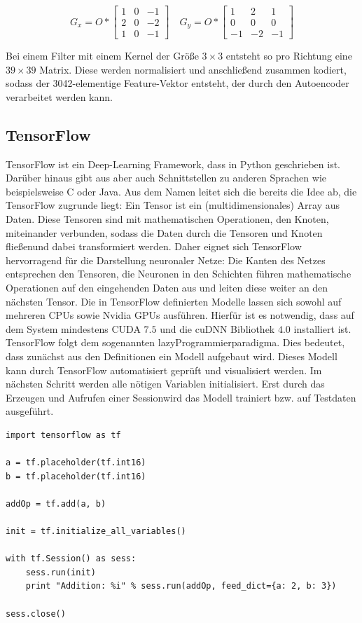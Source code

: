 $$ G_{x} = O * \begin{bmatrix}
  1 & 0 & -1 \\
  2 & 0 & -2 \\
  1 & 0 & -1
\end{bmatrix} \quad
G_{y} = O * \begin{bmatrix}
   1 &  2 &  1 \\
   0 &  0 &  0 \\
  -1 & -2 & -1
\end{bmatrix}
$$

Bei einem Filter mit einem Kernel der Größe $3 \times 3$ entsteht so pro Richtung eine $39 \times 39$ Matrix. Diese werden normalisiert und anschließend zusammen kodiert, sodass der 3042-elementige Feature-Vektor entsteht, der durch den Autoencoder verarbeitet werden kann.

\subsection{TensorFlow}

TensorFlow ist ein Deep-Learning Framework, dass in Python geschrieben ist. Darüber hinaus gibt aus aber auch Schnittstellen zu anderen Sprachen wie beispielsweise C oder Java. Aus dem Namen leitet sich die bereits die Idee ab, die TensorFlow zugrunde liegt: Ein Tensor ist ein (multidimensionales) Array aus Daten. Diese Tensoren sind mit mathematischen Operationen, den Knoten, miteinander verbunden, sodass die Daten durch die Tensoren und Knoten \grqq fließen\grqq und dabei transformiert werden. Daher eignet sich TensorFlow hervorragend für die Darstellung neuronaler Netze: Die Kanten des Netzes entsprechen den Tensoren, die Neuronen in den Schichten führen mathematische Operationen auf den eingehenden Daten aus und leiten diese weiter an den nächsten Tensor. Die in TensorFlow definierten Modelle lassen sich sowohl auf mehreren CPUs sowie Nvidia GPUs ausführen. Hierfür ist es notwendig, dass auf dem System mindestens CUDA $7.5$ und die cuDNN Bibliothek $4.0$ installiert ist. 
TensorFlow folgt dem sogenannten \glqq lazy\grqq  Programmierparadigma. Dies bedeutet, dass zunächst aus den Definitionen ein Modell aufgebaut wird. Dieses Modell kann durch TensorFlow automatisiert geprüft und visualisiert werden. Im nächsten Schritt werden alle nötigen Variablen initialisiert. Erst durch das Erzeugen und Aufrufen einer \glqq Session\grqq wird das Modell trainiert bzw. auf Testdaten ausgeführt.

\lstset{language=Python}
\begin{lstlisting}
import tensorflow as tf

a = tf.placeholder(tf.int16)
b = tf.placeholder(tf.int16)

addOp = tf.add(a, b)

init = tf.initialize_all_variables()

with tf.Session() as sess:
    sess.run(init)
    print "Addition: %i" % sess.run(addOp, feed_dict={a: 2, b: 3})

sess.close()
\end{lstlisting}